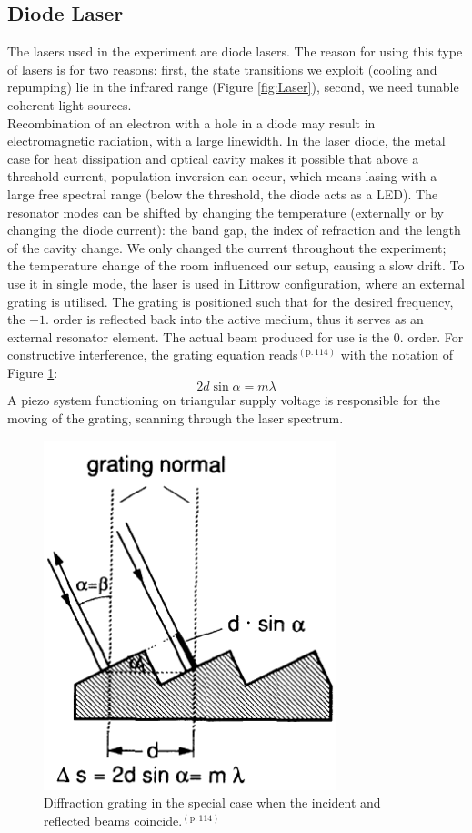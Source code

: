 \documentclass[twocolumn]{article}
\begin{document}
\subsection{Diode Laser}
The lasers used in the experiment are diode lasers. The reason for using this type of lasers is for two reasons: first, the state transitions we exploit (cooling and repumping) lie in the infrared range (Figure \ref{fig:Laser}), second, we need tunable coherent light sources.\\
Recombination of an electron with a hole in a diode may result in electromagnetic radiation, with a large linewidth.\cite{demtroder} In the laser diode, the metal case for heat dissipation and optical cavity makes it possible that above a threshold current, population inversion can occur, which means lasing with a large free spectral range (below the threshold, the diode acts as a LED). The resonator modes can be shifted by changing the temperature (externally or by changing the diode current): the band gap, the index of refraction and the length of the cavity change. We only changed the current throughout the experiment; the temperature change of the room influenced our setup, causing a slow drift. To use it in single mode, the laser is used in Littrow configuration, where an external grating is utilised. The grating is positioned such that for the desired frequency, the $-1.$ order is reflected back into the active medium, thus it serves as an external resonator element. The actual beam produced for use is the $0.$ order. For constructive interference, the grating equation reads\cite{demtroder}$^{(\text{p.}\, 114)}$ with the notation of Figure \ref{fig:Grating}:
\begin{equation}
2 d \sin \alpha = m \lambda\nonumber
\end{equation}
A piezo system functioning on triangular supply voltage is responsible for the moving of the grating, scanning through the laser spectrum.
\begin{figure}
	\centering
	\includegraphics[scale=0.3]{Images/Grating.png}
	\caption{Diffraction grating in the special case when the incident and reflected beams coincide.\cite{demtroder}$^{(\text{p.}\, 114)}$}
	\label{fig:Grating}
\end{figure}
\end{document}

